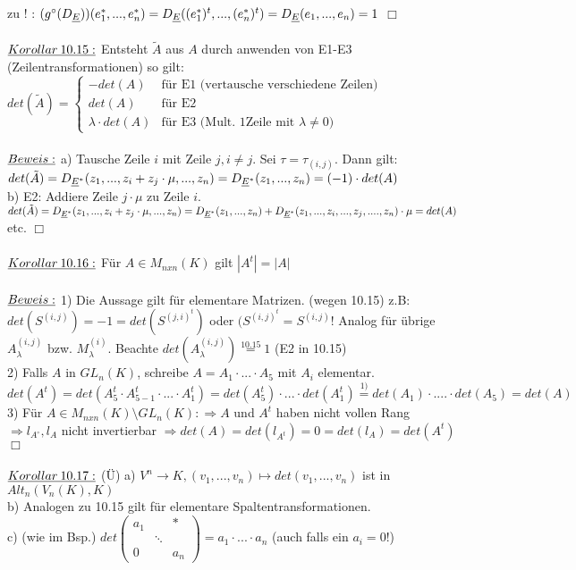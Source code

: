 \documentclass[fleqn, a4paper, 11pt]{article}
\begin{document}
zu ! : $(g^{\circ}(D_{\uline{E}}))(e_1^{\ast},...,e_n^{\ast})=D_{\uline{E}}((e_1^{\ast})^t,...,(e_n^{\ast})^t)=D_{\uline{E}}(e_1,...,e_n)=1$ \hfill $\Box$\\
\\
$\uline{Korollar\:10.15:}$ Entsteht $\tilde{A}$ aus $A$ durch anwenden von E1-E3 (Zeilentransformationen) so gilt:\\
$det(\tilde{A})=\begin{cases}
	-det(A) & \text{f\"ur E1 (vertausche verschiedene Zeilen)}\\
	det(A) & \text{f\"ur E2}\\
	\lambda\cdot det(A) & \text{f\"ur E3 (Mult. 1Zeile mit }\lambda\neq 0)
\end{cases}$\\
\\
$\uline{Beweis:}$ a) Tausche Zeile $i$ mit Zeile $j,i\neq j$. Sei $\tau=\tau_{(i,j)}$. Dann gilt: $det(\tilde{A})=D_{\uline{E}^{\ast}}(z_1,...,z_i+z_j\cdot\mu,...,z_n)=D_{\uline{E}^{\ast}}(z_1,...,z_n)=(-1)\cdot det(A)$\\
b) E2: Addiere Zeile $j\cdot\mu$ zu Zeile $i$. $det(\tilde{A})=D_{\uline{E}^{\ast}}(z_1,...,z_i+z_j\cdot\mu,...,z_n)=D_{\uline{E}^{\ast}}(z_1,...,z_n)+D_{\uline{E}^{\ast}}(z_1,...,z_i,...,z_j,....,z_n)\cdot\mu=det(A)$ etc. \hfill $\Box$\\
\\
$\uline{Korollar\:10.16:}$ F\"ur $A\in M_{nxn}(K)$ gilt $|A^t|=|A|$\\
\\
$\uline{Beweis:}$ 1) Die Aussage gilt f\"ur elementare Matrizen. (wegen 10.15) z.B: $det(S^{(i,j)})=-1=det(S^{(j,i)^t})$ oder $(S^{(i,j)^t}=S^{(i,j)}!$ Analog f\"ur \"ubrige $A_{\lambda}^{(i,j)}$ bzw. $M_{\lambda}^{(i)}$. Beachte $det(A_{\lambda}^{(i,j)})\stackrel{10.15}{=} 1$ (E2 in 10.15)\\
2) Falls $A$ in $GL_n(K)$, schreibe $A=A_1\cdot ...\cdot A_5$ mit $A_i$ elementar. $det(A^t)=det(A_5^t\cdot A_{5-1}^t\cdot ...\cdot A_1^t)=det(A_5^t)\cdot ...\cdot det(A_1^t)\stackrel{1)}{=}det(A_1)\cdot ....\cdot det(A_5)=det(A)$\\
3) F\"ur $A\in M_{nxn}(K)\setminus GL_n(K):\Rightarrow A$ und $A^t$ haben nicht vollen Rang $\Rightarrow l_{A^{\circ}},l_A$ nicht invertierbar $\Rightarrow det(A)=det(l_{A^t})=0=det(l_A)=det(A^t)$ \hfill $\Box$\\
\\
$\uline{Korollar\:10.17:}$ (\"U) a) $V^n\rightarrow K,(v_1,...,v_n)\mapsto det(v_1,...,v_n)$ ist in $Alt_n(V_n(K),K)$\\
b) Analogen zu 10.15 gilt f\"ur elementare Spaltentransformationen.\\
c) (wie im Bsp.) $det\begin{pmatrix}
	a_1 & & \ast \\
	 & \ddots &\\
	 0 & & a_n
\end{pmatrix}=a_1\cdot ...\cdot a_n$ (auch falls ein $a_i=0!$)\\
\\
\end{document}
